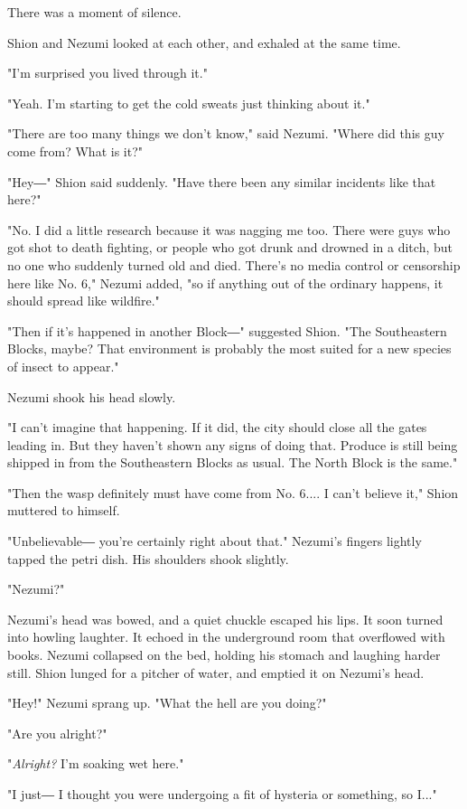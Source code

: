 There was a moment of silence.

Shion and Nezumi looked at each other, and exhaled at the same time.

"I'm surprised you lived through it."

"Yeah. I'm starting to get the cold sweats just thinking about it."

"There are too many things we don't know," said Nezumi. "Where did this
guy come from? What is it?"

"Hey―" Shion said suddenly. "Have there been any similar incidents like
that here?"

"No. I did a little research because it was nagging me too. There were
guys who got shot to death fighting, or people who got drunk and drowned
in a ditch, but no one who suddenly turned old and died. There's no
media control or censorship here like No. 6," Nezumi added, "so if
anything out of the ordinary happens, it should spread like wildfire."

"Then if it's happened in another Block―" suggested Shion. "The
Southeastern Blocks, maybe? That environment is probably the most suited
for a new species of insect to appear."

Nezumi shook his head slowly.

"I can't imagine that happening. If it did, the city should close all
the gates leading in. But they haven't shown any signs of doing that.
Produce is still being shipped in from the Southeastern Blocks as usual.
The North Block is the same."

"Then the wasp definitely must have come from No. 6.... I can't believe
it," Shion muttered to himself.

"Unbelievable― you're certainly right about that." Nezumi's fingers
lightly tapped the petri dish. His shoulders shook slightly.

"Nezumi?"

Nezumi's head was bowed, and a quiet chuckle escaped his lips. It soon
turned into howling laughter. It echoed in the underground room that
overflowed with books. Nezumi collapsed on the bed, holding his stomach
and laughing harder still. Shion lunged for a pitcher of water, and
emptied it on Nezumi's head.

"Hey!" Nezumi sprang up. "What the hell are you doing?"

"Are you alright?"

"\emph{Alright?} I'm soaking wet here."

"I just― I thought you were undergoing a fit of hysteria or something,
so I..."

